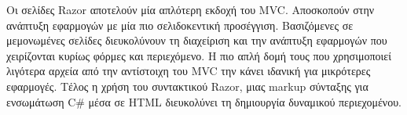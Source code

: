 Οι σελίδες Razor αποτελούν μία απλότερη εκδοχή του MVC. Αποσκοπούν στην ανάπτυξη εφαρμογών με μία πιο
σελιδοκεντική προσέγγιση. Βασιζόμενες σε μεμονωμένες σελίδες διευκολύνουν τη διαχείριση και την ανάπτυξη 
εφαρμογών που χειρίζονται κυρίως φόρμες και περιεχόμενο. Η πιο απλή δομή τους που χρησιμοποιεί λιγότερα
αρχεία από την αντίστοιχη του MVC την κάνει ιδανική για μικρότερες εφαρμογές. Τέλος η χρήση του συντακτικού
Razor, μιας markup σύνταξης για ενσωμάτωση C\# μέσα σε HTML διευκολύνει τη δημιουργία δυναμικού περιεχομένου.
